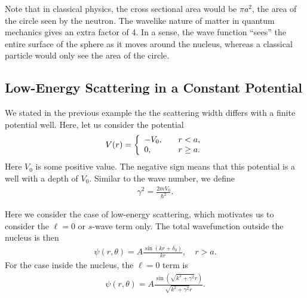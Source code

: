 Note that in classical physics, the cross sectional area would be $\pi a^2$, the area of the circle seen by the neutron. The wavelike nature of matter in quantum mechanics gives an extra factor of 4. In a sense, the wave function ``sees'' the entire surface of the sphere as it moves around the nucleus, whereas a classical particle would only see the area of the circle. 

\subsection{Low-Energy Scattering in a Constant Potential}

We stated in the previous example the the scattering width differs with a finite potential well. Here, let us consider the potential
\begin{align}
  V(r) = \left\{ \begin{array}{l l}
  -V_0, 	& \quad r < a, \\
  0,		& \quad r \ge a. \\ \end{array} \right.
\end{align}
Here $V_0$ is some positive value. The negative sign means that this potential is a well with a depth of $V_0$. Similar to the wave number, we define
\begin{align}
  \gamma^2 = \frac{ 2 m V_0 }{ \hbar^2 } .
\end{align}

Here we consider the case of low-energy scattering, which motivates us to consider the $\ell = 0$ or $s$-wave term only. The total wavefunction outside the nucleus is then
\begin{align}
  \psi(r,\theta) = A \frac{ \sin( kr + \delta_0 ) }{ kr } , \quad r > a.
\end{align}
For the case inside the nucleus, the $\ell = 0$ term is
\begin{align}
  \psi(r,\theta) = A \frac{ \sin( \sqrt{ k^2 + \gamma^2 } r ) }{ \sqrt{ k^2 + \gamma^2 } r } .
\end{align}

